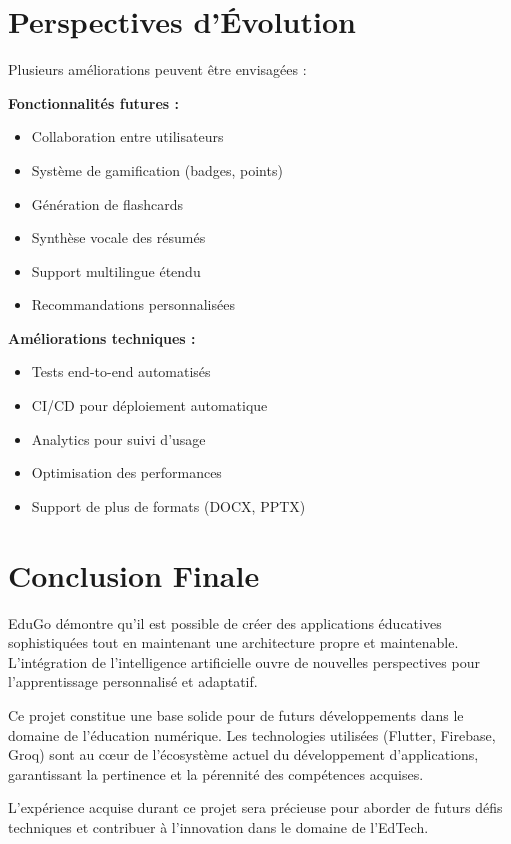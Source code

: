 \documentclass[12pt,a4paper]{report}
\begin{document}
\section*{Perspectives d'Évolution}

Plusieurs améliorations peuvent être envisagées :

\textbf{Fonctionnalités futures :}
\begin{itemize}
    \item Collaboration entre utilisateurs
    \item Système de gamification (badges, points)
    \item Génération de flashcards
    \item Synthèse vocale des résumés
    \item Support multilingue étendu
    \item Recommandations personnalisées
\end{itemize}

\textbf{Améliorations techniques :}
\begin{itemize}
    \item Tests end-to-end automatisés
    \item CI/CD pour déploiement automatique
    \item Analytics pour suivi d'usage
    \item Optimisation des performances
    \item Support de plus de formats (DOCX, PPTX)
\end{itemize}

\section*{Conclusion Finale}

EduGo démontre qu'il est possible de créer des applications éducatives sophistiquées tout en maintenant une architecture propre et maintenable. L'intégration de l'intelligence artificielle ouvre de nouvelles perspectives pour l'apprentissage personnalisé et adaptatif.

Ce projet constitue une base solide pour de futurs développements dans le domaine de l'éducation numérique. Les technologies utilisées (Flutter, Firebase, Groq) sont au cœur de l'écosystème actuel du développement d'applications, garantissant la pertinence et la pérennité des compétences acquises.

L'expérience acquise durant ce projet sera précieuse pour aborder de futurs défis techniques et contribuer à l'innovation dans le domaine de l'EdTech.
\end{document}
